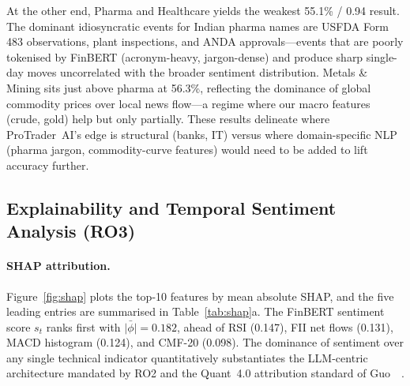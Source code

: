 At the other end, Pharma and Healthcare yields the weakest 55.1\% / 0.94
result. The dominant idiosyncratic events for Indian pharma names are
USFDA Form 483 observations, plant inspections, and ANDA approvals---events
that are poorly tokenised by FinBERT (acronym-heavy, jargon-dense) and
produce sharp single-day moves uncorrelated with the broader sentiment
distribution. Metals \& Mining sits just above pharma at 56.3\%, reflecting
the dominance of global commodity prices over local news flow---a regime
where our macro features (crude, gold) help but only partially. These
results delineate where ProTrader~AI's edge is structural (banks, IT) versus
where domain-specific NLP (pharma jargon, commodity-curve features) would
need to be added to lift accuracy further.

\begin{table}[t]
\centering
\caption{Per-sector performance on the 2024 NIFTY holdout (top~4 +
bottom~2 of 9 industry buckets). Remaining sectors---Automobiles,
Infrastructure, Diversified---fall between 56.8\%--58.4\% accuracy.}
\label{tab:sector}
\end{table}

\subsection{Explainability and Temporal Sentiment Analysis (RO3)}
\label{subsec:res-xai}

\paragraph{SHAP attribution.}
Figure~\ref{fig:shap} plots the top-10 features by mean absolute SHAP,
and the five leading entries are summarised in Table~\ref{tab:shap}a.
The FinBERT sentiment score $s_t$ ranks first with $\bar{|\phi|}=0.182$,
ahead of RSI (0.147), FII net flows (0.131), MACD histogram (0.124), and
CMF-20 (0.098). The dominance of sentiment over any single technical indicator
quantitatively substantiates the LLM-centric architecture mandated by RO2 and
the Quant~4.0 attribution standard of Guo~\etal~\cite{guo2024quant40}.

